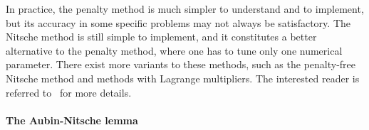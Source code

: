In practice, the penalty method is much simpler to understand and to implement, but its accuracy in some specific problems may not always be satisfactory. The Nitsche method is still simple to implement, and it constitutes a better alternative to the penalty method, where one has to tune only one numerical parameter. There exist more variants to these methods, such as the penalty-free Nitsche method and methods with Lagrange multipliers. The interested reader is referred to~\cite{Chouly2024} for more details.

\paragraph{The Aubin-Nitsche lemma}